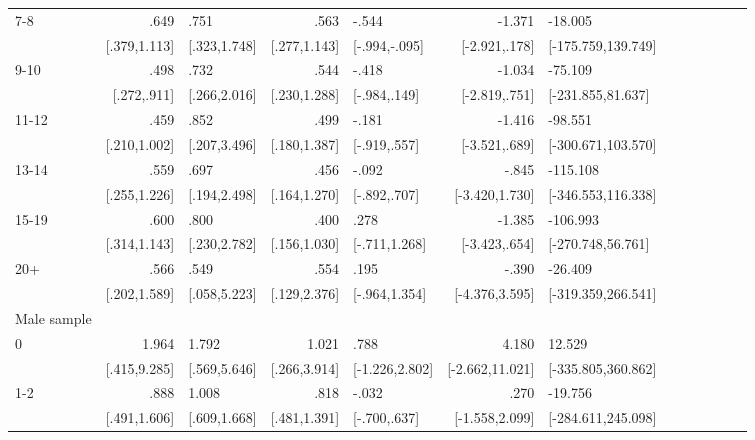 \begin{table}[hp]
\begin{adjustbox}{max width=\linewidth}
\begin{threeparttable}
{\begin{tabular}{l*{6}{D{.}{.}{-1}l}}
7-8             &            .649&            .751&            .563&           -.544&          -1.371&         -18.005\\
                &    [.379,1.113]&    [.323,1.748]&    [.277,1.143]&   [-.994,-.095]&   [-2.921,.178]&[-175.759,139.749]\\

9-10            &            .498&            .732&            .544&           -.418&          -1.034&         -75.109\\
                &     [.272,.911]&    [.266,2.016]&    [.230,1.288]&    [-.984,.149]&   [-2.819,.751]&[-231.855,81.637]\\

11-12           &            .459&            .852&            .499&           -.181&          -1.416&         -98.551\\
                &    [.210,1.002]&    [.207,3.496]&    [.180,1.387]&    [-.919,.557]&   [-3.521,.689]&[-300.671,103.570]\\

13-14           &            .559&            .697&            .456&           -.092&           -.845&        -115.108\\
                &    [.255,1.226]&    [.194,2.498]&    [.164,1.270]&    [-.892,.707]&  [-3.420,1.730]&[-346.553,116.338]\\

15-19           &            .600&            .800&            .400&            .278&          -1.385&        -106.993\\
                &    [.314,1.143]&    [.230,2.782]&    [.156,1.030]&   [-.711,1.268]&   [-3.423,.654]&[-270.748,56.761]\\

20+             &            .566&            .549&            .554&            .195&           -.390&         -26.409\\
                &    [.202,1.589]&    [.058,5.223]&    [.129,2.376]&   [-.964,1.354]&  [-4.376,3.595]&[-319.359,266.541]\\
\midrule
Male sample &&&&&&\\
0               &           1.964&           1.792&           1.021&            .788&           4.180&          12.529\\
                &    [.415,9.285]&    [.569,5.646]&    [.266,3.914]&  [-1.226,2.802]& [-2.662,11.021]&[-335.805,360.862]\\

1-2             &            .888&           1.008&            .818&           -.032&            .270&         -19.756\\
                &    [.491,1.606]&    [.609,1.668]&    [.481,1.391]&    [-.700,.637]&  [-1.558,2.099]&[-284.611,245.098]\\


\end{tabular}}
\end{threeparttable}
\end{adjustbox}
\end{table}
